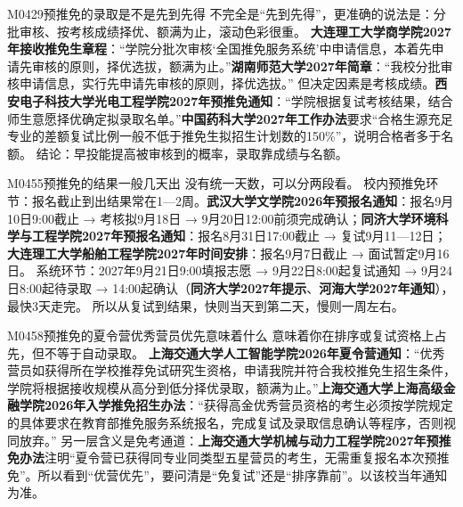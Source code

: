 \begin{qa}{M0429}{预推免的录取是不是先到先得}
不完全是“先到先得”，更准确的说法是：分批审核、按考核成绩择优、额满为止，滚动色彩很重。
\textbf{大连理工大学商学院2027年接收推免生章程}：“学院分批次审核‘全国推免服务系统’中申请信息，本着先申请先审核的原则，择优选拔，额满为止。”\textbf{湖南师范大学2027年简章}：“我校分批审核申请信息，实行先申请先审核的原则，择优选拔。”
但决定因素是考核成绩。\textbf{西安电子科技大学光电工程学院2027年预推免通知}：“学院根据复试考核结果，结合师生意愿择优确定拟录取名单。”\textbf{中国药科大学2027年工作办法}要求“合格生源充足专业的差额复试比例一般不低于推免生拟招生计划数的150\%”，说明合格者多于名额。
结论：早投能提高被审核到的概率，录取靠成绩与名额。
\end{qa}

\begin{qa}{M0455}{预推免的结果一般几天出}
没有统一天数，可以分两段看。
校内预推免环节：报名截止到出结果常在1—2周。\textbf{武汉大学文学院2026年预报名通知}：报名9月10日9:00截止 → 考核拟9月18日 → 9月20日12:00前须完成确认；\textbf{同济大学环境科学与工程学院2027年预报名通知}：报名8月31日17:00截止 → 复试9月11—12日；\textbf{大连理工大学船舶工程学院2027年时间安排}：报名9月7日截止 → 面试暂定9月16日。
系统环节：2027年9月21日9:00填报志愿 → 9月22日8:00起复试通知 → 9月24日8:00起待录取 → 14:00起确认（\textbf{同济大学2027年提示}、\textbf{河海大学2027年通知}），最快3天走完。
所以从复试到结果，快则当天到第二天，慢则一周左右。
\end{qa}

\begin{qa}{M0458}{预推免的夏令营优秀营员优先意味着什么}
意味着你在排序或复试资格上占先，但不等于自动录取。
\textbf{上海交通大学人工智能学院2026年夏令营通知}：“优秀营员如获得所在学校推荐免试研究生资格，申请我院并符合我校推免生招生条件，学院将根据接收规模从高分到低分择优录取，额满为止。”\textbf{上海交通大学上海高级金融学院2026年入学推免招生办法}：“获得高金优秀营员资格的考生必须按学院规定的具体要求在教育部推免服务系统报名，完成复试及录取信息确认等程序，否则视同放弃。”
另一层含义是免考通道：\textbf{上海交通大学机械与动力工程学院2027年预推免办法}注明“夏令营已获得同专业同类型五星营员的考生，无需重复报名本次预推免”。所以看到“优营优先”，要问清是“免复试”还是“排序靠前”。以该校当年通知为准。
\end{qa}

